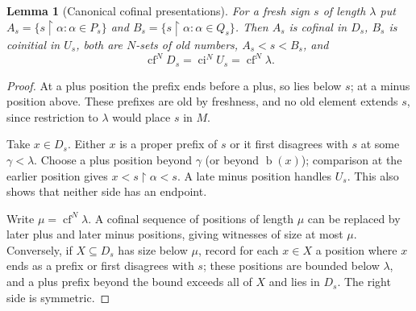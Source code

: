 \documentclass[11pt,letterpaper]{article}
\numberwithin{equation}{section}
\newtheorem{lemma}[lemma]{Lemma}
\theoremstyle{definition}
\theoremstyle{remark}
\newcommand{\bd}{\operatorname{b}}
\newcommand{\cf}{\operatorname{cf}}
\newcommand{\ci}{\operatorname{ci}}
\newcommand{\res}{\mathbin{\upharpoonright}}
\begin{document}
\begin{lemma}[Canonical cofinal presentations]\label{univ:lem:canonicalpresentation}
For a fresh sign $s$ of length $\lambda$ put
$A_s=\{s\res\alpha:\alpha\in P_s\}$ and $B_s=\{s\res\alpha:\alpha\in Q_s\}$.
Then $A_s$ is cofinal in $D_s$, $B_s$ is coinitial in $U_s$, both are $N$-sets
of old numbers, $A_s<s<B_s$, and
\begin{equation}\label{univ:eq:exactcofs}
 \cf^N D_s=\ci^N U_s=\cf^N\lambda.
\end{equation}
\end{lemma}
\begin{proof}
At a plus position the prefix ends before a plus, so lies below $s$; at a minus
position above. These prefixes are old by freshness, and no old element
extends $s$, since restriction to $\lambda$ would place $s$ in $M$.

Take $x\in D_s$. Either $x$ is a proper prefix of $s$ or it first disagrees
with $s$ at some $\gamma<\lambda$. Choose a plus position beyond $\gamma$ (or
beyond $\bd(x)$); comparison at the earlier position gives
$x<s\res\alpha<s$. A late minus position handles $U_s$. This also shows that
neither side has an endpoint.

Write $\mu=\cf^N\lambda$. A cofinal sequence of positions of length $\mu$ can
be replaced by later plus and later minus positions, giving witnesses of size
at most $\mu$. Conversely, if $X\subseteq D_s$ has size below $\mu$, record for
each $x\in X$ a position where $x$ ends as a prefix or first disagrees with
$s$; these positions are bounded below $\lambda$, and a plus prefix beyond the
bound exceeds all of $X$ and lies in $D_s$. The right side is symmetric.
\end{proof}
\end{document}
